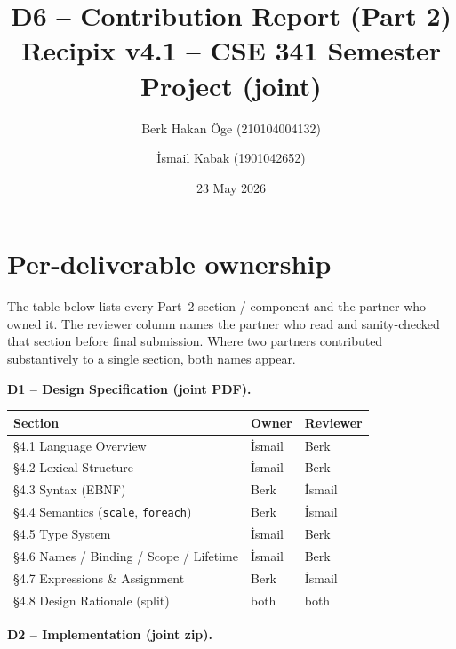 \documentclass[11pt,a4paper]{article}
\title{\textbf{D6 -- Contribution Report (Part 2)} \\
       \large Recipix v4.1 -- CSE 341 Semester Project (joint)}
\author{Berk Hakan \"Oge (210104004132) \and \.Ismail Kabak (1901042652)}
\date{23 May 2026}
\begin{document}
\maketitle
\thispagestyle{fancy}

\section{Per-deliverable ownership}

The table below lists every Part~2 section / component and the partner
who owned it. The reviewer column names the partner who read and
sanity-checked that section before final submission. Where two
partners contributed substantively to a single section, both names
appear.

\renewcommand{\arraystretch}{1.15}

\noindent\textbf{D1 -- Design Specification (joint PDF).}

\begin{center}
\small
\begin{tabular}{@{}p{}p{}p{}@{}}
\toprule
\textbf{Section} & \textbf{Owner} & \textbf{Reviewer} \\
\midrule
\S4.1 Language Overview                          & İsmail            & Berk   \\
\S4.2 Lexical Structure                          & İsmail            & Berk   \\
\S4.3 Syntax (EBNF)                              & Berk              & İsmail \\
\S4.4 Semantics (\texttt{scale}, \texttt{foreach}) & Berk             & İsmail \\
\S4.5 Type System                                & İsmail            & Berk   \\
\S4.6 Names / Binding / Scope / Lifetime         & İsmail            & Berk   \\
\S4.7 Expressions \& Assignment                  & Berk              & İsmail \\
\S4.8 Design Rationale (split)                   & both              & both   \\
\bottomrule
\end{tabular}
\end{center}

\noindent\textbf{D2 -- Implementation (joint zip).}
\end{document}
